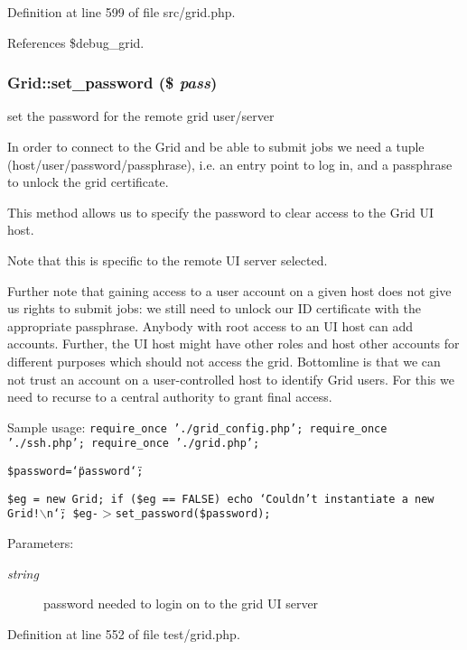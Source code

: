 Definition at line 599 of file src/grid.php.

References \$debug\_\-grid.
\subsubsection{\setlength{\rightskip}{0pt plus 5cm}Grid::set\_\-password (\$ {\em pass})}\label{classGrid_a30}


set the password for the remote grid user/server 

In order to connect to the Grid and be able to submit jobs we need a tuple (host/user/password/passphrase), i.e. an entry point to log in, and a passphrase to unlock the grid certificate.

This method allows us to specify the password to clear access to the Grid UI host.

Note that this is specific to the remote UI server selected.

Further note that gaining access to a user account on a given host does not give us rights to submit jobs: we still need to unlock our ID certificate with the appropriate passphrase. Anybody with root access to an UI host can add accounts. Further, the UI host might have other roles and host other accounts for different purposes which should not access the grid. Bottomline is that we can not trust an account on a user-controlled host to identify Grid users. For this we need to recurse to a central authority to grant final access.

Sample usage: {\tt  require\_\-once './grid\_\-config.php'; require\_\-once './ssh.php'; require\_\-once './grid.php';}

{\tt  \$password=\char`\"{}password\char`\"{};}

{\tt  \$eg = new Grid; if (\$eg == FALSE) echo \char`\"{}Couldn't instantiate a new Grid!$\backslash$n\char`\"{}; \$eg-$>$set\_\-password(\$password); }

\begin{Desc}
\item[Parameters:]
\begin{description}
\item[{\em string}]password needed to login on to the grid UI server \end{description}
\end{Desc}


Definition at line 552 of file test/grid.php.


